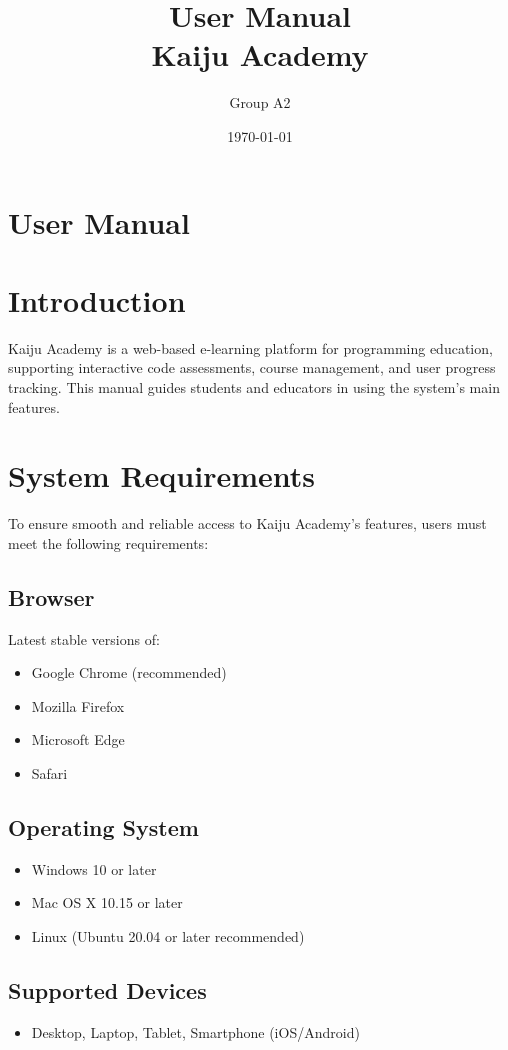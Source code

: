 \documentclass[a4paper,11pt]{scrartcl}
\title{User Manual\\Kaiju Academy}
\author{Group A2}
\date{\today}
\begin{document}
\maketitle

\section*{User Manual}

\tableofcontents
\newpage

\section{Introduction}

Kaiju Academy is a web-based e-learning platform for programming education, supporting interactive code assessments, course management, and user progress tracking. This manual guides students and educators in using the system’s main features.

\section{System Requirements}
To ensure smooth and reliable access to Kaiju Academy’s features, users must meet the following requirements:
\subsection{Browser}
Latest stable versions of:
\begin{itemize}[leftmargin=*]
    \item Google Chrome (recommended)
    \item Mozilla Firefox
    \item Microsoft Edge
    \item Safari
\end{itemize}
\subsection{Operating System}
\begin{itemize}[leftmargin=*]
    \item Windows 10 or later
    \item Mac OS X 10.15 or later
    \item Linux (Ubuntu 20.04 or later recommended)
\end{itemize}
\subsection{Supported Devices}
\begin{itemize}[leftmargin=*]
    \item Desktop, Laptop, Tablet, Smartphone (iOS/Android)
\end{itemize}
\end{document}

